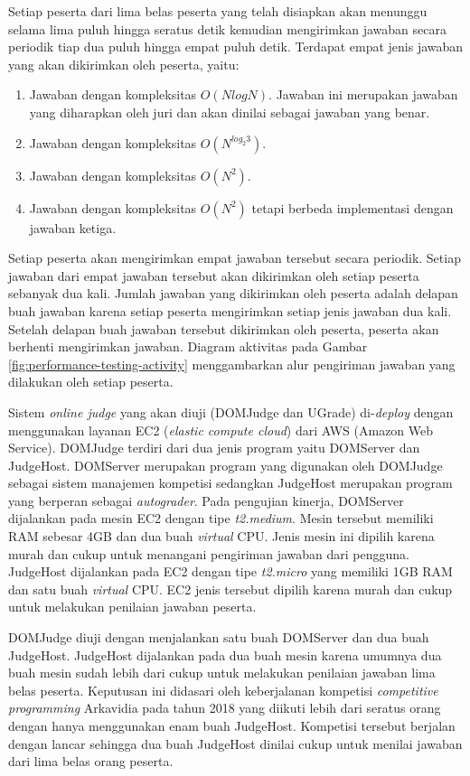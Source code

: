 \par Setiap peserta dari lima belas peserta yang telah disiapkan akan menunggu selama lima puluh hingga seratus detik kemudian mengirimkan jawaban secara periodik tiap dua puluh hingga empat puluh detik. Terdapat empat jenis jawaban yang akan dikirimkan oleh peserta, yaitu:
\begin{enumerate}
    \item Jawaban dengan kompleksitas $O(N log N)$. Jawaban ini merupakan jawaban yang diharapkan oleh juri dan akan dinilai sebagai jawaban yang benar.
    \item Jawaban dengan kompleksitas $O(N^{log_2{3}})$.
    \item Jawaban dengan kompleksitas $O(N^2)$.
    \item Jawaban dengan kompleksitas $O(N^2)$ tetapi berbeda implementasi dengan jawaban ketiga.
\end{enumerate}
Setiap peserta akan mengirimkan empat jawaban tersebut secara periodik. Setiap jawaban dari empat jawaban tersebut akan dikirimkan oleh setiap peserta sebanyak dua kali. Jumlah jawaban yang dikirimkan oleh peserta adalah delapan buah jawaban karena setiap peserta mengirimkan setiap jenis jawaban dua kali. Setelah delapan buah jawaban tersebut dikirimkan oleh peserta, peserta akan berhenti mengirimkan jawaban. Diagram aktivitas pada Gambar \ref{fig:performance-testing-activity} menggambarkan alur pengiriman jawaban yang dilakukan oleh setiap peserta.

\par Sistem \textit{online judge} yang akan diuji (DOMJudge dan UGrade) di-\textit{deploy} dengan menggunakan layanan EC2 (\textit{elastic compute cloud}) dari AWS (Amazon Web Service). DOMJudge terdiri dari dua jenis program yaitu DOMServer dan JudgeHost. DOMServer merupakan program yang digunakan oleh DOMJudge sebagai sistem manajemen kompetisi sedangkan JudgeHost merupakan program yang berperan sebagai \textit{autograder}. Pada pengujian kinerja, DOMServer dijalankan pada mesin EC2 dengan tipe \textit{t2.medium}. Mesin tersebut memiliki RAM sebesar 4GB dan dua buah \textit{virtual} CPU. Jenis mesin ini dipilih karena murah dan cukup untuk menangani pengiriman jawaban dari pengguna. JudgeHost dijalankan pada EC2 dengan tipe \textit{t2.micro} yang memiliki 1GB RAM dan satu buah \textit{virtual} CPU. EC2 jenis tersebut dipilih karena murah dan cukup untuk melakukan penilaian jawaban peserta.

\par DOMJudge diuji dengan menjalankan satu buah DOMServer dan dua buah JudgeHost. JudgeHost dijalankan pada dua buah mesin karena umumnya dua buah mesin sudah lebih dari cukup untuk melakukan penilaian jawaban lima belas peserta. Keputusan ini didasari oleh keberjalanan kompetisi \textit{competitive programming} Arkavidia pada tahun 2018 yang diikuti lebih dari seratus orang dengan hanya menggunakan enam buah JudgeHost. Kompetisi tersebut berjalan dengan lancar sehingga dua buah JudgeHost dinilai cukup untuk menilai jawaban dari lima belas orang peserta.

